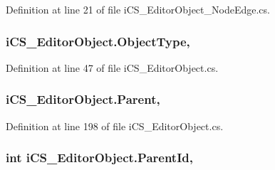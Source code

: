 Definition at line 21 of file i\+C\+S\+\_\+\+Editor\+Object\+\_\+\+Node\+Edge.\+cs.

\hypertarget{classi_c_s___editor_object_ae046107fbcd9d62d93a431caea3ea3a5}{
\subsubsection[{Object\+Type}]{ i\+C\+S\+\_\+\+Editor\+Object.\+Object\+Type\hspace{0.3cm}{\ttfamily [get]}, {\ttfamily [set]}}}\label{classi_c_s___editor_object_ae046107fbcd9d62d93a431caea3ea3a5}


Definition at line 47 of file i\+C\+S\+\_\+\+Editor\+Object.\+cs.

\hypertarget{classi_c_s___editor_object_a0fbec1035ca6324d35ac0b65ec976f4c}{
\subsubsection[{Parent}]{ i\+C\+S\+\_\+\+Editor\+Object.\+Parent\hspace{0.3cm}{\ttfamily [get]}, {\ttfamily [set]}}}\label{classi_c_s___editor_object_a0fbec1035ca6324d35ac0b65ec976f4c}


Definition at line 198 of file i\+C\+S\+\_\+\+Editor\+Object.\+cs.

\hypertarget{classi_c_s___editor_object_adcd715c7c331db648d603821d47946ab}{
\subsubsection[{Parent\+Id}]{\setlength{\rightskip}{0pt plus 5cm}int i\+C\+S\+\_\+\+Editor\+Object.\+Parent\+Id\hspace{0.3cm}{\ttfamily [get]}, {\ttfamily [set]}}}\label{classi_c_s___editor_object_adcd715c7c331db648d603821d47946ab}



